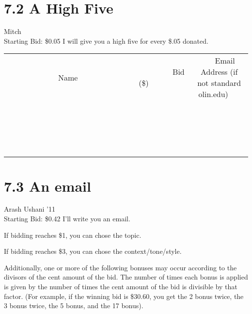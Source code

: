 \documentclass[11pt]{article}
\begin{document}
\section*{7.2 A High Five}
Mitch
\\
Starting Bid: \$0.05
\newline
I will give you a high five for every \$.05 donated.
\\[3ex]
\begin{tabular}{c c c}
~~~~~~~~~~~~~Name~~~~~~~~~~~~~ & ~~~~~~~~~Bid (\$)~~~~~~~~~  & ~~~Email Address (if not standard olin.edu)~~~\\
 & & \\
\hline
 & & \\
\hline
 & & \\
\hline
 & & \\
\hline
 & & \\
\hline
 & & \\
\hline
 & & \\
\hline
 & & \\
\hline
 & & \\
\hline
 & & \\
\hline
 & & \\
\hline
 & & \\
\hline
 & & \\
\hline
 & & \\
\hline
 & & \\
\hline
 & & \\
\hline
 & & \\
\hline
 & & \\
\hline
 & & \\
\hline
\end{tabular}
\newpage
\section*{7.3 An email}
Arash Ushani '11
\\
Starting Bid: \$0.42
\newline
I'll write you an email.

If bidding reaches \$1, you can chose the topic.

If bidding reaches \$3, you can chose the context/tone/style.

Additionally, one or more of the following bonuses may occur according to the divisors of the cent amount of the bid. The number of times each bonus is applied is given by the number of times the cent amount of the bid is divisible by that factor. (For example, if the winning bid is \$30.60, you get the 2 bonus twice, the 3 bonus twice, the 5 bonus, and the 17 bonus). 
\end{document}
